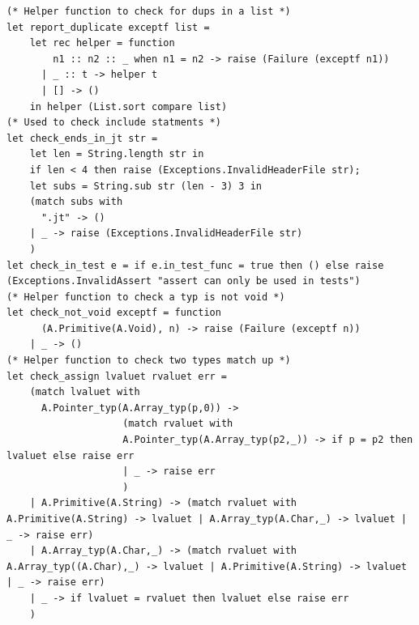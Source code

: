 \documentclass{article}
\begin{document}
\begin{lstlisting}
(* Helper function to check for dups in a list *)
let report_duplicate exceptf list =
    let rec helper = function
        n1 :: n2 :: _ when n1 = n2 -> raise (Failure (exceptf n1))
      | _ :: t -> helper t
      | [] -> ()
    in helper (List.sort compare list)
(* Used to check include statments *)
let check_ends_in_jt str = 
	let len = String.length str in
	if len < 4 then raise (Exceptions.InvalidHeaderFile str);
	let subs = String.sub str (len - 3) 3 in
	(match subs with
	  ".jt" -> ()
	| _ -> raise (Exceptions.InvalidHeaderFile str)
	)
let check_in_test e = if e.in_test_func = true then () else raise (Exceptions.InvalidAssert "assert can only be used in tests")
(* Helper function to check a typ is not void *)
let check_not_void exceptf = function
      (A.Primitive(A.Void), n) -> raise (Failure (exceptf n))
    | _ -> ()
(* Helper function to check two types match up *)
let check_assign lvaluet rvaluet err =
	(match lvaluet with
	  A.Pointer_typ(A.Array_typ(p,0)) -> 
					(match rvaluet with
					A.Pointer_typ(A.Array_typ(p2,_)) -> if p = p2 then lvaluet else raise err
					| _ -> raise err
					)
	| A.Primitive(A.String) -> (match rvaluet with A.Primitive(A.String) -> lvaluet | A.Array_typ(A.Char,_) -> lvaluet | _ -> raise err)
	| A.Array_typ(A.Char,_) -> (match rvaluet with A.Array_typ((A.Char),_) -> lvaluet | A.Primitive(A.String) -> lvaluet | _ -> raise err)
	| _ -> if lvaluet = rvaluet then lvaluet else raise err
	)
     

\end{lstlisting}
\end{document}
